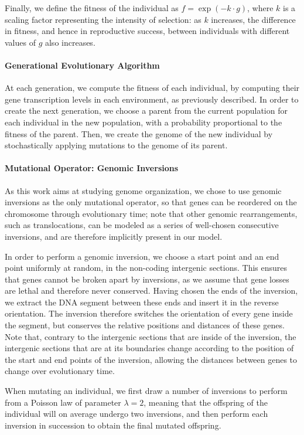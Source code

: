 Finally, we define the fitness of the individual as $f = \exp(-k \cdot g)$, where $k$ is a scaling factor representing the intensity of selection: as $k$ increases, the difference in fitness, and hence in reproductive success, between individuals with different values of $g$ also increases.

\paragraph{Generational Evolutionary Algorithm}
At each generation, we compute the fitness of each individual, by computing their gene transcription levels in each environment, as previously described.
In order to create the next generation, we choose a parent from the current population for each individual in the new population, with a probability proportional to the fitness of the parent.
Then, we create the genome of the new individual by stochastically applying mutations to the genome of its parent.

\paragraph{Mutational Operator: Genomic Inversions}
As this work aims at studying genome organization, we chose to use genomic inversions as the only mutational operator, so that genes can be reordered on the chromosome through evolutionary time; note that other genomic rearrangements, such as translocations, can be modeled as a series of well-chosen consecutive inversions, and are therefore implicitly present in our model.

In order to perform a genomic inversion, we choose a start point and an end point uniformly at random, in the non-coding intergenic sections.
This ensures that genes cannot be broken apart by inversions, as we assume that gene losses are lethal and therefore never conserved.
Having chosen the ends of the inversion, we extract the DNA segment between these ends and insert it in the reverse orientation.
The inversion therefore switches the orientation of every gene inside the segment, but conserves the relative positions and distances of these genes.
Note that, contrary to the intergenic sections that are inside of the inversion, the intergenic sections that are at its boundaries change according to the position of the start and end points of the inversion, allowing the distances between genes to change over evolutionary time.

When mutating an individual, we first draw a number of inversions to perform from a Poisson law of parameter $\lambda = 2$, meaning that the offspring of the individual will on average undergo two inversions, and then perform each inversion in succession to obtain the final mutated offspring.


